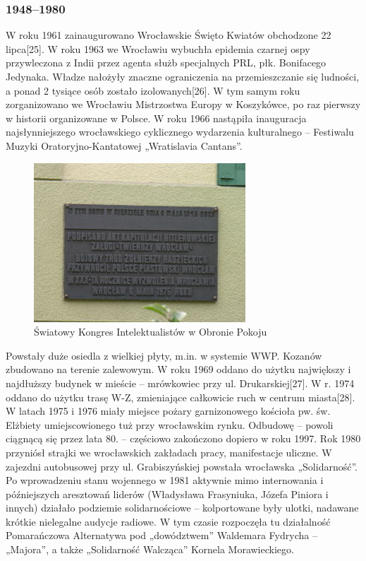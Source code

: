 \documentclass{article}
\begin{document}
\subsubsection{1948–1980}
W roku 1961 zainaugurowano Wrocławskie Święto Kwiatów obchodzone 22 lipca[25].
\bigskip
\newline
W roku 1963 we Wrocławiu wybuchła epidemia czarnej ospy przywleczona z Indii przez agenta służb specjalnych PRL, płk. Bonifacego Jedynaka. Władze nałożyły znaczne ograniczenia na przemieszczanie się ludności, a ponad 2 tysiące osób zostało izolowanych[26].
\bigskip
\newline
W tym samym roku zorganizowano we Wrocławiu Mistrzostwa Europy w Koszykówce, po raz pierwszy w historii organizowane w Polsce.
\bigskip
\newline
W roku 1966 nastąpiła inauguracja najsłynniejszego wrocławskiego cyklicznego wydarzenia kulturalnego – Festiwalu Muzyki Oratoryjno-Kantatowej „Wratislavia Cantans”.
\bigskip
\newline
\begin{figure}[h]
\centering
\includegraphics[scale=2]{17.JPG}
\caption{Światowy Kongres Intelektualistów w Obronie Pokoju}
\end{figure}
\bigskip
\newline
Powstały duże osiedla z wielkiej płyty, m.in. w systemie WWP. Kozanów zbudowano na terenie zalewowym. W roku 1969 oddano do użytku największy i najdłuższy budynek w mieście – mrówkowiec przy ul. Drukarskiej[27].
\bigskip
\newline
W r. 1974 oddano do użytku trasę W-Z, zmieniające całkowicie ruch w centrum miasta[28].
\bigskip
\newline
W latach 1975 i 1976 miały miejsce pożary garnizonowego kościoła pw. św. Elżbiety umiejscowionego tuż przy wrocławskim rynku. Odbudowę – powoli ciągnącą się przez lata 80. – częściowo zakończono dopiero w roku 1997.
\bigskip
\newline
Rok 1980 przyniósł strajki we wrocławskich zakładach pracy, manifestacje uliczne. W zajezdni autobusowej przy ul. Grabiszyńskiej powstała wrocławska „Solidarność”. Po wprowadzeniu stanu wojennego w 1981 aktywnie mimo internowania i późniejszych aresztowań liderów (Władysława Frasyniuka, Józefa Piniora i innych) działało podziemie solidarnościowe – kolportowane były ulotki, nadawane krótkie nielegalne audycje radiowe. W tym czasie rozpoczęła tu działalność Pomarańczowa Alternatywa pod „dowództwem” Waldemara Fydrycha – „Majora”, a także „Solidarność Walcząca” Kornela Morawieckiego.
\end{document}

